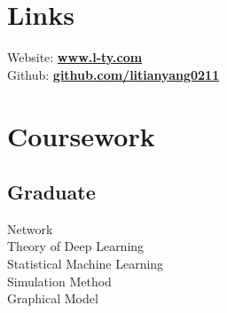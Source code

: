 \documentclass[letterpaper]{deedy-resume} %
\begin{document}

\lastupdated %



\begin{minipage}[t]{0.33\textwidth} %


\section{Links} 
Website: \href{https://www.l-ty.com}{\bf www.l-ty.com} \\
Github: \href{https://github.com/litianyang0211}{\bf github.com/litianyang0211} \\

\sectionspace %


\section{Coursework}
\subsection{Graduate}
Network \\
Theory of Deep Learning \\
Statistical Machine Learning \\
Simulation Method \\
Graphical Model \\


\end{minipage}
\end{document}
